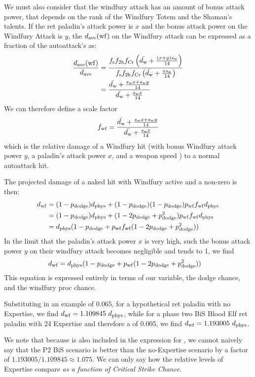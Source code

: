 We must also consider that the windfury attack has an amount of bonus attack power, that depends on the rank of the Windfury Totem and the Shaman's talents.
If the ret paladin's attack power is $x$ and the bonus attack power on the Windfury Attack is $y$, the $d_{\mathrm{ave}} (\mathrm{wf})$ on the Windfury attack can be expressed as a fraction of the autoattack's \dave as:
\begin{equation*}
	\begin{aligned}
		\frac{d_{\mathrm{ave}} (\mathrm{wf})}{d_{\mathrm{ave}} } &= \frac{f_{\mathrm{s}}  f_{\mathrm{2h}}  f_{\mathrm{Cr}}  \left( \bar{d_\mathrm{w}}  + \frac{(x+y)s_\mathrm{w} }{14} \right)}{f_{\mathrm{s}}  f_{\mathrm{2h}}  f_{\mathrm{Cr}}  \left( \bar{d_\mathrm{w} } + \frac{xs_\mathrm{w} }{14} \right)} \\
		&= \frac{\bar{d_\mathrm{w}}  + \frac{s_\mathrm{w}  x + s_\mathrm{w}  y}{14}}{\bar{d_\mathrm{w}}  + \frac{s_\mathrm{w}  x}{14}}
	\end{aligned}
\end{equation*}
We can therefore define a scale factor
\begin{equation}
	f_{\mathrm{wf}}  = \frac{\bar{d_\mathrm{w}}  + \frac{s_\mathrm{w}  x + s_\mathrm{w}  y}{14}}{\bar{d_\mathrm{w}}  + \frac{s_\mathrm{w}  x}{14}}
\end{equation}
which is the relative damage of a Windfury hit (with bonus Windfury attack power $y$, a paladin's attack power $x$, and a weapon speed \ws) to a normal autoattack hit.

The projected damage of a naked hit with Windfury active and a non-zero \pdodge is then:
\begin{equation*}
	\begin{aligned}
		d_\mathrm{wf} &= (1 - p_{\mathrm{dodge}} ) d_{\mathrm{phys}}  + (1 - p_{\mathrm{dodge}} ) (1 - p_{\mathrm{dodge}} ) p_{\mathrm{wf}}  f_{\mathrm{wf}}  d_{\mathrm{phys}} \\
		&= (1 - p_{\mathrm{dodge}} ) d_{\mathrm{phys}}  + (1 - 2p_{\mathrm{dodge}}  + p_{\mathrm{dodge}} ^2) p_{\mathrm{wf}}  f_{\mathrm{wf}}  d_{\mathrm{phys}}  \\
		&= d_{\mathrm{phys}} (1 - p_{\mathrm{dodge}}  + p_{\mathrm{wf}} f_{\mathrm{wf}} (1 - 2p_{\mathrm{dodge}}  + p_{\mathrm{dodge}} ^2))
	\end{aligned}
\end{equation*}
In the limit that the paladin's attack power $x$ is very high, such the bonus attack power $y$ on their windfury attack becomes negligible and \fwf tends to 1, we find
\begin{equation*}
	\begin{aligned}
		d_\mathrm{wf}  &= d_{\mathrm{phys}} (1 - p_{\mathrm{dodge}}  + p_{\mathrm{wf}} (1 - 2p_{\mathrm{dodge}}  + p_{\mathrm{dodge}} ^2))
	\end{aligned}
\end{equation*}
This equation is expressed entirely in terms of our \dphys variable, the dodge chance, and the windfury proc chance.

Substituting in an example \pdodge of $0.065$, for a hypothetical ret paladin with no Expertise, we find $d_\mathrm{wf} = 1.109845~d_{\mathrm{phys}} $, while for a phase two BiS Blood Elf ret paladin with 24 Expertise and therefore a \pdodge of 0.005, we find $d_\mathrm{wf} = 1.193005~d_{\mathrm{phys}} $.

We note that because \pdodge is also included in the expression for \dphys, we cannot naively say that the P2 BiS scenario is better than the no-Expertise scenario by a factor of $1.193005/1.109845 \approx 1.075$.
We can only say how the relative levels of Expertise compare \emph{as a function of Critical Strike Chance}.


